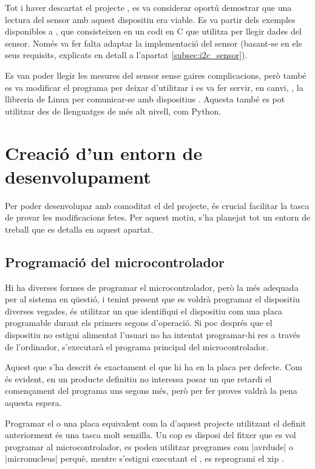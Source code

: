 Tot i haver descartat el projecte , es va considerar
oportú demostrar que una lectura del sensor amb aquest dispositiu era viable.
Es va partir dels exemples disponibles a \cite{I2cTinyUsb}, que consisteixen en
un codi en C que utilitza  per llegir dades del sensor. Només va
fer falta adaptar la implementació del sensor (basant-se en els seus requisits,
explicats en detall a l'apartat \ref{subsec:i2c_sensor}).

Es van poder llegir les mesures del sensor sense gaires complicacions, però també
es va modificar el programa per deixar d'utilitzar  i es va fer servir,
en canvi, , la llibreria de Linux per comunicar-se amb dispositius
. Aquesta també es pot utilitzar des de llenguatges de més alt nivell,
com Python.

\section{Creació d'un entorn de desenvolupament}

Per poder desenvolupar amb comoditat el  del projecte, és crucial
facilitar la tasca de provar les modificacions fetes. Per aquest motiu, s'ha
planejat tot un entorn de treball que es detalla en aquest apartat.

\subsection{Programació del microcontrolador}
\label{subsec:bootloader}

Hi ha diverses formes de programar el microcontrolador, però la més adequada
per al sistema en qüestió, i tenint present que es voldrà programar el dispositiu
diverses vegades, és utilitzar un  que identifiqui el dispositiu
com una placa programable durant els primers segons d'operació. Si poc després 
que el dispositiu no estigui alimentat l'usuari no ha intentat programar-hi res 
a través de l'ordinador, s'executarà el programa principal del microcontrolador.

Aquest  que s'ha descrit és exactament el que hi ha en la
placa  per defecte. Com és evident, en un producte definitiu no
interessa posar un  que retardi el començament del programa
uns segons més, però per fer proves valdrà la pena aquesta espera.

Programar el  o una placa equivalent com la d'aquest projecte
utilitzant el  definit anteriorment és una tasca molt senzilla.
Un cop es disposi del fitxer  que es vol programar al
microcontrolador, es poden utilitzar programes com \ord|avrdude| o
\est|micronucleus| perquè, mentre s'estigui executant el , es 
reprogrami el xip \cite{DigisparkBootloader}.


